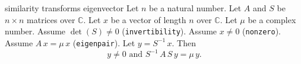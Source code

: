 \begin{cleanresult}{similarity transforms eigenvector}
Let $n$ be a natural number.
Let $A$ and $S$ be $n\times n$ matrices over $\mathbb{C}$.
Let $x$ be a vector of length $n$ over $\mathbb{C}$.
Let $\mu$ be a complex number.
Assume $\det(S) \ne 0$ (\texttt{invertibility}).
Assume $x \ne 0$ (\texttt{nonzero}).
Assume $A \, x = \mu \, x$ (\texttt{eigenpair}).
Let $y = {S}^{-1} \, x$.
Then \[y \ne 0 \text{ and } {S}^{-1} \, A \, S \, y = \mu \, y.\]
\par{}
\end{cleanresult}

